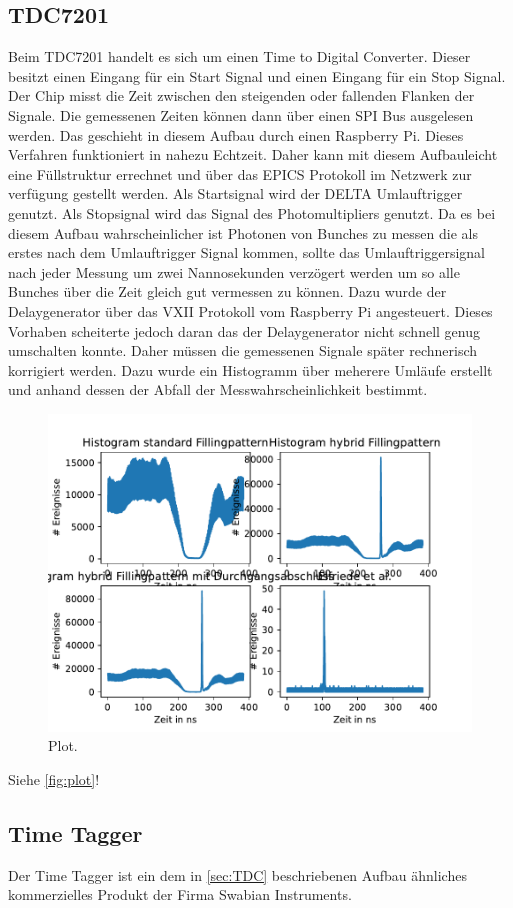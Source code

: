 \subsection{TDC7201}
\label{sec:TDC}
Beim TDC7201 handelt es sich um einen Time to Digital Converter. Dieser besitzt einen Eingang für ein 
Start Signal und einen Eingang für ein Stop Signal. Der Chip misst die Zeit zwischen den steigenden oder 
fallenden Flanken der Signale. Die gemessenen Zeiten können dann über einen SPI Bus ausgelesen werden.
Das geschieht in diesem Aufbau durch einen Raspberry Pi. Dieses Verfahren funktioniert in nahezu Echtzeit. 
Daher kann mit diesem Aufbauleicht eine Füllstruktur errechnet und über das EPICS Protokoll im Netzwerk 
zur verfügung gestellt werden. Als Startsignal wird der DELTA Umlauftrigger genutzt. Als Stopsignal wird 
das Signal des Photomultipliers genutzt. Da es bei diesem Aufbau wahrscheinlicher ist Photonen von Bunches 
zu messen die als erstes nach dem Umlauftrigger Signal kommen, sollte das Umlauftriggersignal nach jeder 
Messung um zwei Nannosekunden verzögert werden um so alle Bunches über die Zeit gleich gut vermessen zu können.
Dazu wurde der Delaygenerator über das VXII Protokoll vom Raspberry Pi angesteuert.
Dieses Vorhaben scheiterte jedoch daran das der Delaygenerator nicht schnell genug umschalten konnte.
Daher müssen die gemessenen Signale später rechnerisch korrigiert werden. Dazu wurde ein Histogramm über 
meherere Umläufe erstellt und anhand dessen der Abfall der Messwahrscheinlichkeit bestimmt.
\begin{figure}
  \centering
  \includegraphics{content/plots/multiplot1.pdf}
  \caption{Plot.}
  \label{fig:plot}
\end{figure}


Siehe \autoref{fig:plot}!


\subsection{Time Tagger}
\label{sec:TimeTagger}
Der Time Tagger ist ein dem in \autoref{sec:TDC} beschriebenen Aufbau ähnliches kommerzielles Produkt
der Firma Swabian Instruments.